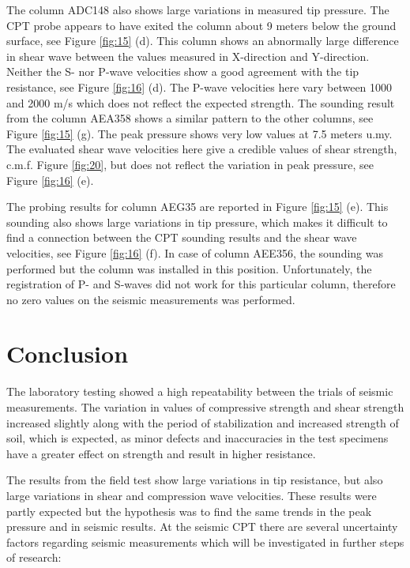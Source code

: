 \documentclass[final,3p,times,onecolumn,authoryear]{elsarticle}
\begin{document}
The column ADC148 also shows large variations in measured tip pressure. The CPT probe appears to have exited the column about 9 meters below the ground surface, see Figure \ref{fig:15} (d). This column shows an abnormally large difference in shear wave between the values measured in X-direction and Y-direction. Neither the S- nor P-wave velocities show a good agreement with the tip resistance, see Figure \ref{fig:16} (d). The P-wave velocities here vary between 1000 and 2000 m/s which does not reflect the expected strength. The sounding result from the column AEA358 shows a similar pattern to the other columns, see Figure \ref{fig:15} (g). The peak pressure shows very low values at 7.5 meters u.my. The evaluated shear wave velocities here give a credible values of shear strength, c.m.f. Figure \ref{fig:20}, but does not reflect the variation in peak pressure, see Figure \ref{fig:16} (e).

The probing results for column AEG35 are reported in Figure \ref{fig:15} (e). This sounding also shows large variations in tip pressure, which makes it difficult to find a connection between the CPT sounding results and the shear wave velocities, see Figure \ref{fig:16} (f). In case of column AEE356, the sounding was performed but the column was installed in this position. Unfortunately, the registration of P- and S-waves did not work for this particular column, therefore no zero values on the seismic measurements was performed.

\section{Conclusion}

The laboratory testing showed a high repeatability between the trials of seismic measurements. The variation in values of compressive strength and shear strength increased slightly along with the period of stabilization and increased strength of soil, which is expected, as minor defects and inaccuracies in the test specimens have a greater effect on strength and result in higher resistance. 

The results from the field test show large variations in tip resistance, but also large variations in shear and compression wave velocities. These results were partly expected but the hypothesis was to find the same trends in the peak pressure and in seismic results. At the seismic CPT there are several uncertainty factors regarding seismic measurements which will be investigated in further steps of research:
\end{document}
